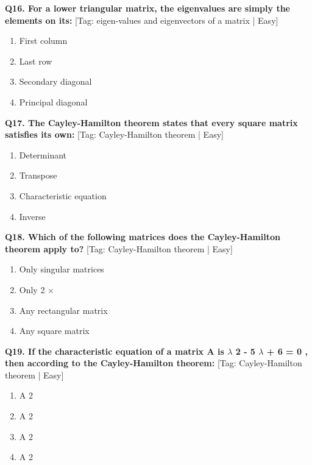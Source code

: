 \noindent\textbf{Q16. For a lower triangular matrix, the eigenvalues are simply the elements on its:} \hfill [Tag: eigen-values and eigenvectors of a matrix | Easy]
\begin{enumerate}[label=(\alph*),topsep=2pt,itemsep=1pt,partopsep=0pt,parsep=0pt]
    \item {{First column}}
    \item {{Last row}}
    \item {{Secondary diagonal}}
    \item {{Principal diagonal}}
\end{enumerate}
\vspace{2mm}

\noindent\textbf{Q17. The Cayley-Hamilton theorem states that every square matrix satisfies its own:} \hfill [Tag: Cayley-Hamilton theorem | Easy]
\begin{enumerate}[label=(\alph*),topsep=2pt,itemsep=1pt,partopsep=0pt,parsep=0pt]
    \item {{Determinant}}
    \item {{Transpose}}
    \item {{Characteristic equation}}
    \item {{Inverse}}
\end{enumerate}
\vspace{2mm}

\noindent\textbf{Q18. Which of the following matrices does the Cayley-Hamilton theorem apply to?} \hfill [Tag: Cayley-Hamilton theorem | Easy]
\begin{enumerate}[label=(\alph*),topsep=2pt,itemsep=1pt,partopsep=0pt,parsep=0pt]
    \item {{Only singular matrices}}
    \item {{Only 2 $\times$}}
    \item {{Any rectangular matrix}}
    \item {{Any square matrix}}
\end{enumerate}
\vspace{2mm}

\noindent\textbf{Q19. If the characteristic equation of a matrix A is $\lambda$ 2 - 5 $\lambda$ + 6 = 0 , then according to the Cayley-Hamilton theorem:} \hfill [Tag: Cayley-Hamilton theorem | Easy]
\begin{enumerate}[label=(\alph*),topsep=2pt,itemsep=1pt,partopsep=0pt,parsep=0pt]
    \item {{A 2}}
    \item {{A 2}}
    \item {{A 2}}
    \item {{A 2}}
\end{enumerate}
\vspace{2mm}


